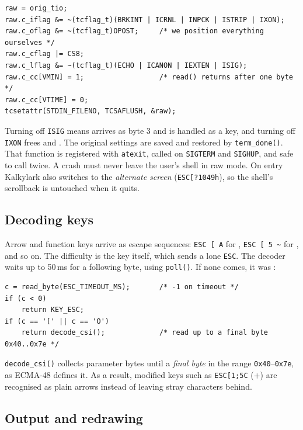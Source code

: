 \documentclass[11pt]{article}
\begin{document}
\begin{lstlisting}[style=c]
raw = orig_tio;
raw.c_iflag &= ~(tcflag_t)(BRKINT | ICRNL | INPCK | ISTRIP | IXON);
raw.c_oflag &= ~(tcflag_t)OPOST;     /* we position everything ourselves */
raw.c_cflag |= CS8;
raw.c_lflag &= ~(tcflag_t)(ECHO | ICANON | IEXTEN | ISIG);
raw.c_cc[VMIN] = 1;                  /* read() returns after one byte  */
raw.c_cc[VTIME] = 0;
tcsetattr(STDIN_FILENO, TCSAFLUSH, &raw);
\end{lstlisting}

Turning off \texttt{ISIG} means  arrives as byte 3 and is
handled as a key, and turning off \texttt{IXON} frees  and
. The original settings are saved and restored by
\texttt{term\_done()}. That function is registered with \texttt{atexit},
called on \texttt{SIGTERM} and \texttt{SIGHUP}, and safe to call twice. A
crash must never leave the user's shell in raw mode. On entry Kalkylark
also switches to the \emph{alternate screen} (\texttt{ESC[?1049h}), so the
shell's scrollback is untouched when it quits.

\subsection{Decoding keys}

Arrow and function keys arrive as escape sequences: \texttt{ESC [ A} for
\up, \texttt{ESC [ 5 \textasciitilde} for , and so on. The
difficulty is the  key itself, which sends a lone \texttt{ESC}.
The decoder waits up to 50\,ms for a following byte, using
\texttt{poll()}. If none comes, it was :

\begin{lstlisting}[style=c]
c = read_byte(ESC_TIMEOUT_MS);       /* -1 on timeout */
if (c < 0)
    return KEY_ESC;
if (c == '[' || c == 'O')
    return decode_csi();             /* read up to a final byte 0x40..0x7e */
\end{lstlisting}

\texttt{decode\_csi()} collects parameter bytes until a \emph{final byte}
in the range \texttt{0x40}--\texttt{0x7e}, as ECMA-48 defines it. As a
result, modified keys such as \texttt{ESC[1;5C} (+\rgt) are
recognised as plain arrows instead of leaving stray characters behind.

\subsection{Output and redrawing}
\end{document}
